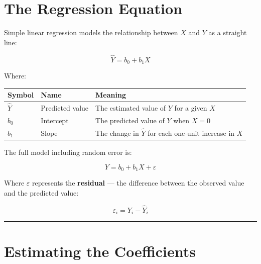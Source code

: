 \documentclass[
  12pt,
  letterpaper,
]{book}
\newcounter{none} %
\begin{document}
\section{The Regression Equation}\label{the-regression-equation}

Simple linear regression models the relationship between \(X\) and \(Y\)
as a straight line:

\[\hat{Y} = b_0 + b_1 X\]

Where:

{\def\LTcaptype{none} %
\begin{longtable}[]{@{}
  >{\centering\arraybackslash}p{}
  >{\raggedright\arraybackslash}p{}
  >{\raggedright\arraybackslash}p{}@{}}
\toprule\noalign{}
\begin{minipage}[b]{\linewidth}\centering
Symbol
\end{minipage} & \begin{minipage}[b]{\linewidth}\raggedright
Name
\end{minipage} & \begin{minipage}[b]{\linewidth}\raggedright
Meaning
\end{minipage} \\
\midrule\noalign{}
\endhead
\bottomrule\noalign{}
\endlastfoot
\(\hat{Y}\) & Predicted value & The estimated value of \(Y\) for a given
\(X\) \\
\(b_0\) & Intercept & The predicted value of \(Y\) when \(X = 0\) \\
\(b_1\) & Slope & The change in \(\hat{Y}\) for each one-unit increase
in \(X\) \\
\end{longtable}
}

The full model including random error is:

\[Y = b_0 + b_1 X + \varepsilon\]

Where \(\varepsilon\) represents the \textbf{residual} --- the
difference between the observed value and the predicted value:

\[\varepsilon_i = Y_i - \hat{Y}_i\]

\begin{center}\rule{0.5\linewidth}{0.5pt}\end{center}

\section{Estimating the Coefficients}\label{estimating-the-coefficients}
\end{document}
